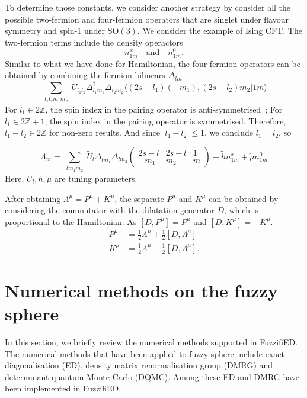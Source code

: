 \documentclass{timesjhep}
\begin{document}
To determine those constants, we consider another strategy by consider all the possible two-fermion and four-fermion operators that are singlet under flavour symmetry and spin-1 under $\mathrm{SO}(3)$. We consider the example of Ising CFT. The two-fermion terms include the density operactors 
\begin{equation*}
    n^x_{1m}\quad\textrm{and}\quad n^0_{1m}.
\end{equation*}
Similar to what we have done for Hamiltonian, the four-fermion operators can be obtained by combining the fermion bilinears $\Delta_{lm}$ 
\begin{equation}
    \sum_{\substack{l_1l_2m_1m_2}}\tilde{U}_{l_1l_2}\Delta^\dagger_{l_1m_1}\Delta_{l_2m_2}\langle (2s-l_1)(-m_1),(2s-l_2)m_2|1m\rangle
\end{equation} 
For $l_1\in2\mathbb{Z}$, the spin index in the pairing operator is anti-symmetrised~; For $l_1\in2\mathbb{Z}+1$, the spin index in the pairing operator is symmetrised. Therefore, $l_1-l_2\in2\mathbb{Z}$ for non-zero results. And since $|l_1-l_2|\leq 1$, we conclude $l_1=l_2$. so 

\begin{equation}
    \Lambda_m=\sum_{\substack{lm_1m_2}}\tilde{U}_{l}\Delta^\dagger_{lm_1}\Delta_{lm_2}\begin{pmatrix}2s-l&2s-l&1\\-m_1&m_2&m     \end{pmatrix}+\tilde{h}n^x_{1m}+\tilde{\mu}n^0_{1m} 
\end{equation}
Here, $\tilde{U}_l,\tilde{h},\tilde{\mu}$ are tuning parameters. 

After obtaining $\Lambda^\mu=P^\mu+K^\mu$, the separate $P^\mu$ and $K^\mu$ can be obtained by considering the commutator with the dilatation generator $D$, which is proportional to the Hamiltonian. As $[D,P^\mu]=P^\mu$ and $[D,K^\mu]=-K^\mu$.
\begin{align}
    P^\mu&=\tfrac{1}{2}\Lambda^\mu+\tfrac{1}{2}[D,\Lambda^\mu]\nonumber\\
    K^\mu&=\tfrac{1}{2}\Lambda^\mu-\tfrac{1}{2}[D,\Lambda^\mu].
\end{align} 

\section{Numerical methods on the fuzzy sphere}
\label{sec:numerics}

In this section, we briefly review the numerical methods supported in FuzzifiED. The numerical methods that have been applied to fuzzy sphere include exact diagonalisation (ED), density matrix renormalisation group (DMRG) and determinant quantum Monte Carlo (DQMC). Among these ED and DMRG have been implemented in FuzzifiED. 
\end{document}
